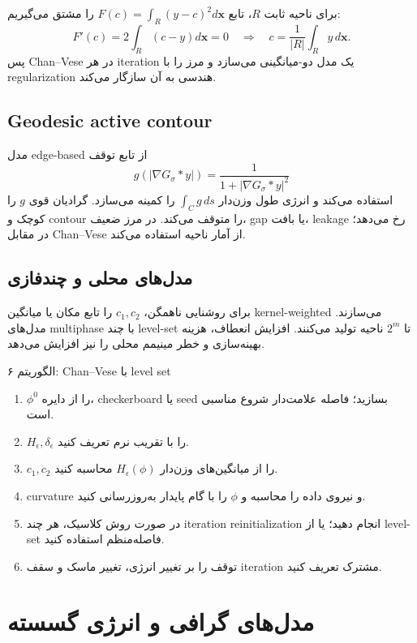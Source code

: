 \documentclass[12pt,openany,oneside]{book}
\newcommand{\abs}[1]{\left\lvert #1\right\rvert}
\newcommand{\vect}[1]{\bm{#1}}
\begin{document}
\begin{proofbox}
برای ناحیه ثابت \(R\)، تابع \(F(c)=\int_R(y-c)^2d\vect x\) را مشتق می‌گیریم:
\[
F'(c)=2\int_R(c-y)d\vect x=0
\quad\Rightarrow\quad
c=\frac{1}{|R|}\int_R y\,d\vect x.
\]
پس Chan--Vese در هر iteration یک مدل دو-میانگینی می‌سازد و مرز را با regularization هندسی به آن سازگار می‌کند.
\end{proofbox}

\subsection{Geodesic active contour}
مدل edge-based از تابع توقف
\[
g(\abs{\nabla G_\sigma*y})=\frac{1}{1+\abs{\nabla G_\sigma*y}^2}
\]
استفاده می‌کند و انرژی طول وزن‌دار \(\int_C g\,ds\) را کمینه می‌سازد. گرادیان قوی \(g\) را کوچک و contour را
متوقف می‌کند. در مرز ضعیف، gap یا بافت، leakage رخ می‌دهد؛ در مقابل Chan--Vese از آمار ناحیه استفاده می‌کند.

\subsection{مدل‌های محلی و چندفازی}
برای روشنایی ناهمگن، \(c_1,c_2\) را تابع مکان یا میانگین kernel-weighted می‌سازند. مدل‌های multiphase با چند level-set
تا \(2^m\) ناحیه تولید می‌کنند. افزایش انعطاف، هزینه بهینه‌سازی و خطر مینیمم محلی را نیز افزایش می‌دهد.

\begin{algorithmbox}{الگوریتم ۶: Chan--Vese با level set}
\begin{enumerate}
\item \(\phi^0\) را از دایره، checkerboard یا seed بسازید؛ فاصله علامت‌دار شروع مناسبی است.
\item \(H_\epsilon,\delta_\epsilon\) را با تقریب نرم تعریف کنید.
\item \(c_1,c_2\) را از میانگین‌های وزن‌دار \(H_\epsilon(\phi)\) محاسبه کنید.
\item curvature و نیروی داده را محاسبه و \(\phi\) را با گام پایدار به‌روزرسانی کنید.
\item در صورت روش کلاسیک، هر چند iteration reinitialization انجام دهید؛ یا از level-set فاصله‌منظم استفاده کنید.
\item توقف را بر تغییر انرژی، تغییر ماسک و سقف iteration مشترک تعریف کنید.
\end{enumerate}
\end{algorithmbox}

\section{مدل‌های گرافی و انرژی گسسته}
\end{document}
